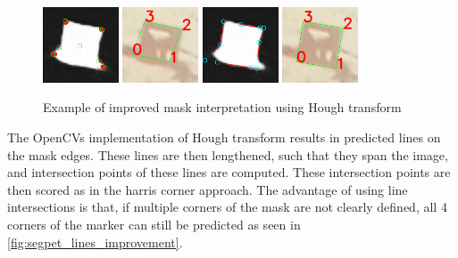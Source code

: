 \documentclass[10pt]{book}
\begin{document}
\begin{figure}
  \centering
     {\includegraphics[width=0.2\textwidth]{image/segpet_mask_2_pred_corners}}
     {\includegraphics[width=0.2\textwidth]{image/segpet_mask_2_pred_rect}}
     {\includegraphics[width=0.2\textwidth]{image/segpet_mask_2_pred_intersects}}
     {\includegraphics[width=0.2\textwidth]{image/segpet_mask_2_lines_pred_rect}}
  \caption{Example of improved mask interpretation using Hough transform}
  \label{fig:segpet_lines_improvement}
\end{figure}

The \acp{OpenCV} implementation of Hough transform results in predicted lines on the mask edges. These lines are then lengthened, such that they span the image, and intersection points of these lines are computed. These intersection points are then scored as in the harris corner approach. The advantage of using line intersections is that, if multiple corners of the mask are not clearly defined, all 4 corners of the marker can still be predicted as seen in \autoref{fig:segpet_lines_improvement}. %
\end{document}
